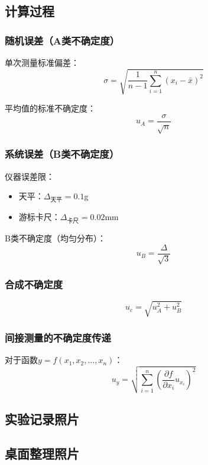 \documentclass[dvipsnames, svgnames,a4paper,11pt]{article}
\newcommand{\recordblank}[1]{\par\vspace*{#1}\par}
\begin{document}
\subsection{计算过程}
\subsubsection{随机误差（A类不确定度）}

单次测量标准偏差：
\begin{equation}
	\sigma = \sqrt{\frac{1}{n-1}\sum_{i=1}^{n}(x_i-\bar{x})^2}
\end{equation}

平均值的标准不确定度：
\begin{equation}
	u_A = \frac{\sigma}{\sqrt{n}}
\end{equation}

\subsubsection{系统误差（B类不确定度）}

仪器误差限：
\begin{itemize}
	\item 天平：$\Delta_{\text{天平}} = 0.1$g
	\item 游标卡尺：$\Delta_{\text{卡尺}} = 0.02$mm
\end{itemize}

B类不确定度（均匀分布）：
\begin{equation}
	u_B = \frac{\Delta}{\sqrt{3}}
\end{equation}

\subsubsection{合成不确定度}

\begin{equation}
	u_c = \sqrt{u_A^2 + u_B^2}
\end{equation}

\subsubsection{间接测量的不确定度传递}

对于函数$y = f(x_1, x_2, \ldots, x_n)$：
\begin{equation}
	u_y = \sqrt{\sum_{i=1}^{n}\left(\frac{\partial f}{\partial x_i}u_{x_i}\right)^2}
\end{equation}

\subsection{实验记录照片}

\recordblank{7cm}

\subsection{桌面整理照片}

\recordblank{7cm}
\end{document}
